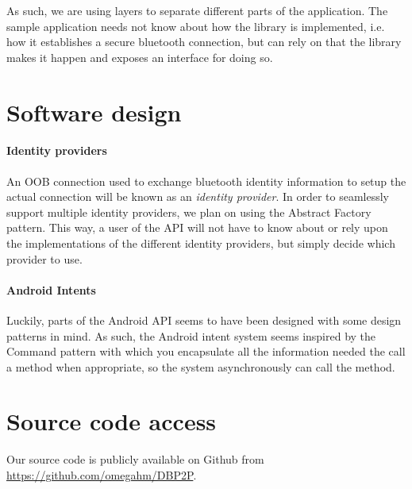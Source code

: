 \documentclass[a4paper,11pt]{article}
\begin{document}
As such, we are using layers to separate different parts of the application.
The sample application needs not know about how the library is implemented, i.e. how it establishes a secure bluetooth connection, but can rely on that the library makes it happen and exposes an interface for doing so.


\section{Software design}
\paragraph{Identity providers}
An OOB connection used to exchange bluetooth identity information to setup the actual connection will be known as an \emph{identity provider}. In order to seamlessly support multiple identity providers, we plan on using the Abstract Factory\cite{GangOfFour} pattern. This way, a user of the API will not have to know about or rely upon the implementations of the different identity providers, but simply decide which provider to use.

\paragraph{Android Intents}
Luckily, parts of the Android API seems to have been designed with some design patterns in mind. As such, the Android intent system seems inspired by the Command\cite{GangOfFour} pattern with which you encapsulate all the information needed the call a method when appropriate, so the system asynchronously can call the method.


\section{Source code access}
Our source code is publicly available on Github from \url{https://github.com/omegahm/DBP2P}.


\end{document}
